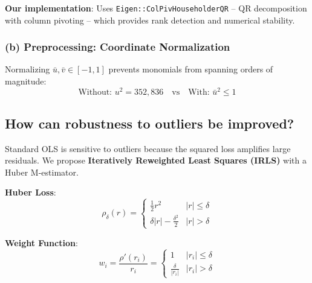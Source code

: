 \documentclass[11pt,a4paper]{article}
\begin{document}
\textbf{Our implementation}: Uses \texttt{Eigen::ColPivHouseholderQR} -- QR decomposition with column pivoting -- which provides rank detection and numerical stability.

\subsubsection{(b) Preprocessing: Coordinate Normalization}

Normalizing $\bar{u}, \bar{v} \in [-1, 1]$ prevents monomials from spanning orders of magnitude:
\begin{equation}
\text{Without: } u^2 = 352,836 \quad \text{vs} \quad \text{With: } \bar{u}^2 \leq 1
\end{equation}

\subsection{How can robustness to outliers be improved?}

Standard OLS is sensitive to outliers because the squared loss amplifies large residuals. We propose \textbf{Iteratively Reweighted Least Squares (IRLS)} with a Huber M-estimator.

\textbf{Huber Loss}:
\begin{equation}
\rho_\delta(r) = \begin{cases}
\frac{1}{2}r^2 & |r| \leq \delta \\
\delta |r| - \frac{\delta^2}{2} & |r| > \delta
\end{cases}
\end{equation}

\textbf{Weight Function}:
\begin{equation}
w_i = \frac{\rho'(r_i)}{r_i} = \begin{cases}
1 & |r_i| \leq \delta \\
\frac{\delta}{|r_i|} & |r_i| > \delta
\end{cases}
\end{equation}
\end{document}
